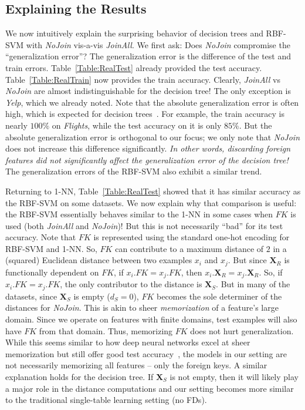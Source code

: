 \documentclass{vldb}
\begin{document}
\subsection{Explaining the Results}

We now intuitively explain the surprising behavior of decision trees and RBF-SVM with \textit{NoJoin} vis-a-vis \textit{JoinAll}.
We first ask: {Does \textit{NoJoin} compromise the ``generalization error''?} The generalization error is the difference of the test and train errors.
Table~\ref{Table:RealTest} already provided the test accuracy. Table~\ref{Table:RealTrain} now provides the train accuracy. Clearly, \textit{JoinAll} vs 
\textit{NoJoin} are almost indistinguishable for the decision tree! The only exception is \textit{Yelp}, which we already noted. 
Note that the absolute generalization error is often high, which is expected for decision trees~\cite{dtreebias2}. 
For example, the train accuracy is nearly $100\%$ on \textit{Flights}, while the test accuracy on it is only $85\%$.
But the absolute generalization error is orthogonal to our focus; we only note that \textit{NoJoin} does not increase this difference significantly.
\textit{In other words, discarding foreign features did not significantly affect the generalization error of the decision tree!} 
The generalization errors of the RBF-SVM also exhibit a similar trend.

Returning to 1-NN, Table~\ref{Table:RealTest} showed that it has similar accuracy as the RBF-SVM on some datasets. We now explain why that comparison is useful: the RBF-SVM 
essentially behaves similar to the 1-NN in some cases when $FK$ is used (both \textit{JoinAll} and \textit{NoJoin})! But this is not necessarily ``bad'' for its test accuracy.
Note that $FK$ is represented using the standard one-hot encoding for RBF-SVM and 1-NN. So, $FK$ can contribute to a maximum distance of $2$ in a (squared) Euclidean distance between 
two examples $x_i$ and $x_j$.
But since $\textbf{X}_R$ is functionally dependent on $FK$, if $x_i.FK = x_j.FK$, then $x_i.\textbf{X}_R = x_j.\textbf{X}_R$. So, if $x_i.FK = x_j.FK$, the only contributor to 
the distance is $\textbf{X}_S$. But in many of the datasets, since $\textbf{X}_S$ is empty ($d_S = 0$), $FK$ becomes the sole determiner of the distances for \textit{NoJoin}.
This is akin to sheer \textit{memorization} of a feature's large domain. Since we operate on features with finite domains, test examples will also have $FK$ from that domain. 
Thus, memorizing $FK$ does not hurt generalization. While this seems similar to how deep neural networks excel at sheer memorization but still offer good test accuracy~\cite{rechtdnn}, 
the models in our setting are not necessarily memorizing all features -- only the foreign keys.
A similar explanation holds for the decision tree. If $\textbf{X}_S$ is not empty, then it will likely play a major role in the distance computations and our setting 
becomes more similar to the traditional single-table learning setting (no FDs).
\end{document}
